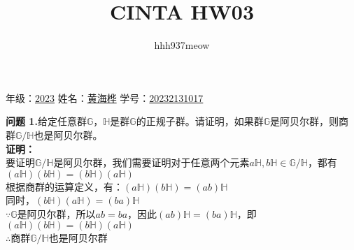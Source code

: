 \documentclass[a4paper]{CINTA}
\title{CINTA HW03}
\author{hhh937meow}
\begin{document}
\maketitle
\begin{center}
    年级：\underline{2023\hspace{1.5cm}} 
    姓名：\underline{黄海桦\hspace{1.5cm}} 
    学号：\underline{20232131017\hspace{1.5cm}} 
\end{center}

\textbf{问题 1.}给定任意群$\mathbb{G}$，$\mathbb{H}$是群$\mathbb{G}$的正规子群。请证明，如果群$\mathbb{G}$是阿贝尔群，则商群$\mathbb{G}/\mathbb{H}$也是阿贝尔群。\\
\textbf{证明：} \\
要证明$\mathbb{G}/\mathbb{H}$是阿贝尔群，我们需要证明对于任意两个元素$a\mathbb{H},b\mathbb{H} \in \mathbb{G}/\mathbb{H}$，都有$(a\mathbb{H})(b\mathbb{H})=(b\mathbb{H})(a\mathbb{H})$ \\
根据商群的运算定义，有：$(a\mathbb{H})(b\mathbb{H})=(ab)\mathbb{H}$ \\
同时，$(b\mathbb{H})(a\mathbb{H})=(ba)\mathbb{H}$ \\
$\because \mathbb{G}$是阿贝尔群，所以$ab=ba$，因此$(ab)\mathbb{H}=(ba)\mathbb{H}$，即$(a\mathbb{H})(b\mathbb{H})=(b\mathbb{H})(a\mathbb{H})$ \\
$\therefore$商群$\mathbb{G}/\mathbb{H}$也是阿贝尔群 \\
\end{document}
